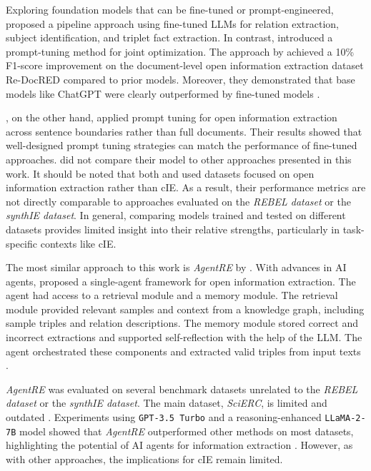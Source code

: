 \documentclass[a4paper,oneside,bibliography=totoc]{scrbook}
\begin{document}
Exploring foundation models that can be fine-tuned or prompt-engineered, \citet{Xue2024} proposed a pipeline approach using fine-tuned \acp{LLM} for relation extraction, subject identification, and triplet fact extraction. In contrast, \citet{Chen2024} introduced a prompt-tuning method for joint optimization. The approach by \citet{Xue2024} achieved a 10\% F1-score improvement on the document-level open information extraction dataset Re-DocRED compared to prior models. Moreover, they demonstrated that base models like ChatGPT were clearly outperformed by fine-tuned models \cite{Xue2024}.

\citet{Chen2024}, on the other hand, applied prompt tuning for open information extraction across sentence boundaries rather than full documents. Their results showed that well-designed prompt tuning strategies can match the performance of fine-tuned approaches. \citet{Chen2024} did not compare their model to other approaches presented in this work. It should be noted that both \citet{Chen2024} and \citet{Xue2024} used datasets focused on open information extraction rather than \ac{cIE}. As a result, their performance metrics are not directly comparable to approaches evaluated on the \textit{REBEL dataset} or the \textit{synthIE dataset}. In general, comparing models trained and tested on different datasets provides limited insight into their relative strengths, particularly in task-specific contexts like \ac{cIE}.

The most similar approach to this work is \textit{AgentRE} by \citet{Shi2024}. With advances in AI agents, \citet{Shi2024} proposed a single-agent framework for open information extraction. The agent had access to a retrieval module and a memory module. The retrieval module provided relevant samples and context from a knowledge graph, including sample triples and relation descriptions. The memory module stored correct and incorrect extractions and supported self-reflection with the help of the \ac{LLM}. The agent orchestrated these components and extracted valid triples from input texts \cite{Shi2024}.

\textit{AgentRE} was evaluated on several benchmark datasets unrelated to the \textit{REBEL dataset} or the \textit{synthIE dataset}. The main dataset, \textit{SciERC}, is limited and outdated \cite{Luan2018}. Experiments using \texttt{GPT-3.5 Turbo} and a reasoning-enhanced \texttt{LLaMA-2-7B} model showed that \textit{AgentRE} outperformed other methods on most datasets, highlighting the potential of AI agents for information extraction \cite{Shi2024}. However, as with other approaches, the implications for \ac{cIE} remain limited.
\end{document}
